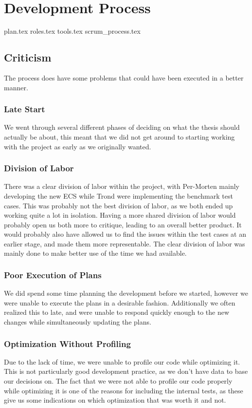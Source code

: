 \chapter{Development Process}
\label{chap:process}

{plan.tex}
{roles.tex}
{tools.tex}
{scrum_process.tex}

\section{Criticism}
The process does have some problems that could have been executed in a better manner.

\subsection{Late Start}
We went through several different phases of deciding on what the thesis should actually be about,
this meant that we did not get around to starting working with the project as early as we originally
wanted.

\subsection{Division of Labor}
There was a clear division of labor within the project, with Per-Morten mainly developing
the new ECS while Trond were implementing the benchmark test cases.
This was probably not the best division of labor,
as we both ended up working quite a lot in isolation.
Having a more shared division of labor would probably open us both more to critique,
leading to an overall better product.
It would probably also have allowed us to find the issues within the test cases at an earlier stage,
and made them more representable.
The clear division of labor was mainly done to make better use of the time we had available.

\subsection{Poor Execution of Plans}
We did spend some time planning the development before we started, however we were unable
to execute the plans in a desirable fashion. Additionally we often realized this to late,
and were unable to respond quickly enough to the new changes while simultaneously updating the plans.

\subsection{Optimization Without Profiling}
Due to the lack of time, we were unable to profile our code while optimizing it.
This is not particularly good development practice, as we don't have data to base
our decisions on.
The fact that we were not able to profile our code properly while optimizing it
is one of the reasons for including the internal tests, as these give us some
indications on which optimization that was worth it and not.
